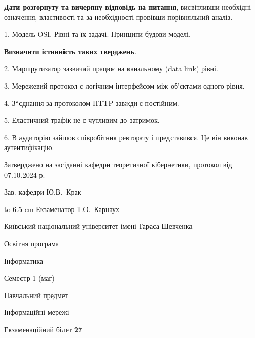\documentclass[12pt, ukrainian]{article}
\begin{document}
{
\qquad\textbf{Дати розгорнуту та вичерпну відповідь на питання}, висвітливши необхідні означення, властивості та за необхідності провівши порівняльний аналіз.

1. Модель OSI. Рівні та їх задачі. Принципи будови моделі.



\qquad\textbf{Визначити істинність таких тверджень}.

2. Маршрутизатор зазвичай працює на канальному (data link) рівні.


3. Мережевий протокол є логічним інтерфейсом між об'єктами одного рівня.


4. З“єднання за протоколом  HTTP завжди є постійним.


5. Еластичний трафік не є чутливим до затримок.


6. В аудиторію зайшов співробітник ректорату і представився. Це він виконав аутентифікацію.

}
{\smallskip\smallskip \begin {scriptsize} Затверджено на засіданні кафедри теоретичної кібернетики, протокол   від   07.10.2024 р.\par\smallskip\smallskip\smallskip\smallskip
{\parbox {6.5 cm} {Зав. кафедри \dotfill Ю.В.~Крак}}\hspace {0.7cm} {\hbox to 6.5 cm { Екзаменатор \dotfill Т.О.~Карнаух}} \end{scriptsize}}
\vspace{0.9cm}
{{\begin {scriptsize}\par
{ \center  Київський національний університет імені Тараса Шевченка \par}
{\parbox {5 cm}{Освітня програма \hfill}{\parbox {7 cm}{Інформатика\hfill}}\parbox {6 cm}{\hfill Семестр 1 (маг)}}\par
{\parbox {5 cm} {Навчальний предмет \hfill}\parbox {7 cm}{Інформаційні мережі \hfill}\parbox {6cm}{\hfill}\par}\vspace{-15pt} \end{scriptsize}}{\center Екзаменаційний білет \No \textbf { 27 }\par}}
\end{document}
